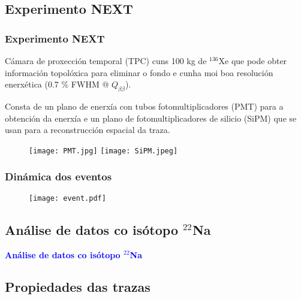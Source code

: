 \documentclass[10pt]{beamer}
\newcommand{\azul}[1]{\textcolor{blue}{#1}}
\begin{document}
\subsection{Experimento NEXT}

\begin{frame}\frametitle{Experimento NEXT}

\bi \justifying
\item Cámara de proxección temporal (TPC) cuns 100 kg de $^{136}$Xe que pode obter información topolóxica para eliminar o fondo e cunha moi boa resolución enerxética (0.7 \% FWHM @ $Q_{\beta\beta}$).

\item Consta de un plano de enerxía con tubos fotomultiplicadores (PMT) para a obtención da enerxía e un plano de fotomultiplicadores de silicio (SiPM) que se usan para a reconstrucción espacial da traza.
\ei

\vspace{-0.2cm}

\begin{figure}
\centering
\texttt{[image: PMT.jpg]}
\texttt{[image: SiPM.jpeg]}
\end{figure}

\end{frame}

\begin{frame}\frametitle{Dinámica dos eventos}
\begin{figure}
\centering
\texttt{[image: event.pdf]}
\end{figure}

\end{frame}

\begin{frame}
\begin{center}

\section{Análise de datos co isótopo $^{22}$Na}

{\bf\azul{Análise de datos co isótopo $^{22}$Na}}

\end{center}
\end{frame}

\subsection{Propiedades das trazas}
\end{document}
